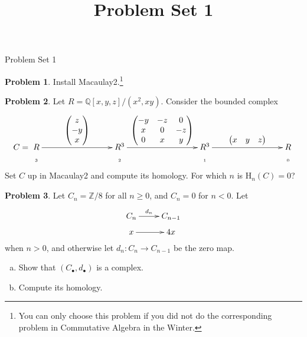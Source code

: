 \documentclass[11pt]{article}
\title{}
\date{\vspace{-0.5in}}
\title{Problem Set 1}
\theoremstyle{definition}
\newtheorem{problem}{Problem}
\begin{document}
\thispagestyle{fancy}
\pagestyle{fancy}


\begin{center}
	{\LARGE Problem Set 1}
\end{center}

\vspace{3em}

\setcounter{problem}{-1}

\begin{problem}
	Install Macaulay2.\footnote{You can only choose this problem if you did not do the corresponding problem in Commutative Algebra in the Winter.}
\end{problem}



\begin{problem}
	Let $R = \mathbb{Q}[x,y,z]/(x^2,xy)$. Consider the bounded complex
	$$C = \xymatrix@R=1mm@C=30mm{R \ar[r]^-{\begin{pmatrix} z \\ -y \\ x \end{pmatrix}} & R^3 \ar[r]^-{\begin{pmatrix} -y & -z & 0 \\ x & 0 & -z \\ 0 & x & y \end{pmatrix}
} & R^3 \ar[r]^-{\begin{pmatrix} x & y & z\end{pmatrix}
} & R \\ \text{{\tiny 3}} & \text{{\tiny 2}} & \text{{\tiny 1}} & \text{{\tiny 0}}}$$
Set $C$ up in Macaulay2 and compute its homology. For which $n$ is $\textrm{H}_n(C) = 0$?
\end{problem}



\begin{problem}
	Let $C_n = \mathbb{Z}/8$ for all $n \geqslant 0$, and $C_n = 0$ for $n<0$. Let 
	$$\xymatrix@R=2mm{C_n \ar[r]^-{d_n} & C_{n-1} \\ x \ar[r] & 4x}$$
	when $n>0$, and otherwise let $d_n\!: C_n \longrightarrow C_{n-1}$ be the zero map.
	\begin{enumerate}[a)]
		\item Show that $(C_\bullet,d_\bullet)$ is a complex.
		\item Compute its homology.
	\end{enumerate}
\end{problem}
\end{document}
